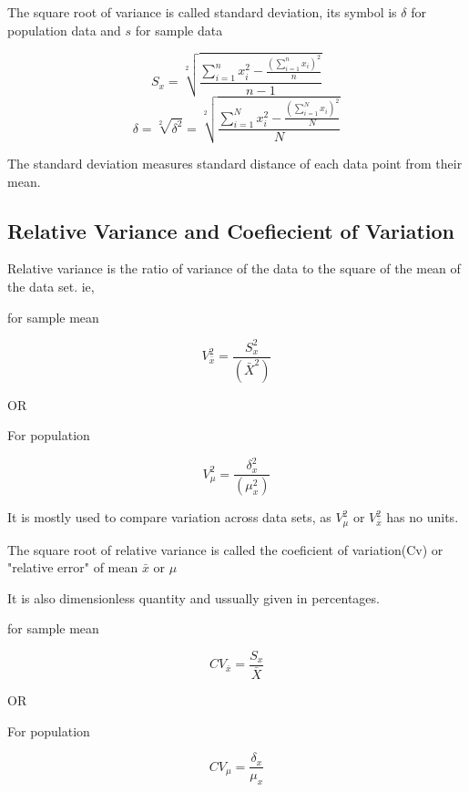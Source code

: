 \documentclass[12pt]{article}
\begin{document}
The square root of variance is called standard deviation, its symbol is $\delta$ for population data and $s$ for sample data

\begin{equation}
    S_x = \sqrt[2]{\frac{\sum_{i = 1}^{n} x_i^2 - \frac{(\sum_{i = 1}^{n}x_i)^2}{n}}{n-1}}
\end{equation}
\begin{equation}
    \delta = \sqrt[2]{\delta^2} = \sqrt[2]{\frac{\sum_{i = 1}^{N} x_i^2 - \frac{(\sum_{i = 1}^{N}x_i)^2}{N}}{N}}
\end{equation}

The standard deviation measures standard distance of each data point from their mean.
\subsection{Relative Variance and Coefiecient of Variation}

Relative variance is the ratio of variance of the data to the square of the mean of the data set. ie,
\begin{center}
    for sample mean
\end{center}
\begin{equation}
    V_{\bar{x}}^2 = \frac{S_x^2}{(\bar{X}^2)}
\end{equation}
\begin{center}
    OR
\end{center}
\begin{center}
    For population
\end{center}
\begin{equation}
    V_{\mu}^2 = \frac{\delta_x^2}{(\mu_x^2)}
\end{equation}

It is mostly used to compare variation across data sets, as $V_{\mu}^2$ or $V_{\bar{x}}^2$ has no units.

The square root of relative variance is called the coeficient of variation(Cv) or "relative error" of mean $\bar{x}$ or $\mu$

It is also dimensionless quantity and ussually given in percentages.

\begin{center}
    for sample mean
\end{center}
\begin{equation}
    CV_{\bar{x}} = \frac{S_x}{\bar{X}}
\end{equation}
\begin{center}
    OR
\end{center}
\begin{center}
    For population
\end{center}
\begin{equation}
    CV_{\mu} = \frac{\delta_x}{\mu_x}
\end{equation}
\end{document}
